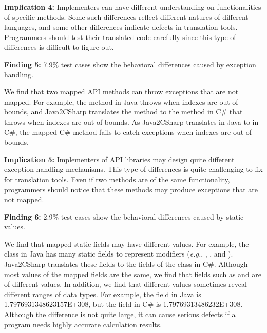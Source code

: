 \textbf{Implication 4:} Implementers can have different understanding on functionalities of specific methods. Some such differences reflect different natures of different languages, and some other differences indicate  defects in translation tools. Programmers should test their translated code carefully since this type of differences is difficult to figure out.

\textbf{Finding 5:} 7.9\% test cases show the behavioral differences caused by exception handling.

We find that two mapped API methods can throw exceptions that are not mapped. For example, the  method in Java throws  when indexes are out of bounds, and Java2CSharp translates the method to the  method in C\# that throws  when indexes are out of bounds. As Java2CSharp translates  in Java to  in C\#, the mapped C\# method fails to catch exceptions when indexes are out of bounds.

\textbf{Implication 5:} Implementers of API libraries may design quite different exception handling mechanisms. This type of differences is quite challenging to fix for translation tools. Even if two methods are of the same functionality, programmers should notice that these methods may produce exceptions that are not mapped.

\textbf{Finding 6:} 2.9\% test cases show the behavioral differences caused by static values.

We find that mapped static fields may have different values. For example, the  class in Java has many static fields to represent modifiers (\emph{e.g.}, , , and ). Java2CSharp translates these fields to the fields of the  class in C\#. Although most values of the mapped fields are the same, we find that fields such as  and  are of different values. In addition, we find that different values sometimes reveal different ranges of data types. For example, the  field in Java is 1.7976931348623157E+308, but the  field in C\# is 1.79769313486232E+308.  Although the difference is not quite large, it can cause serious defects if a program needs highly accurate calculation results.

